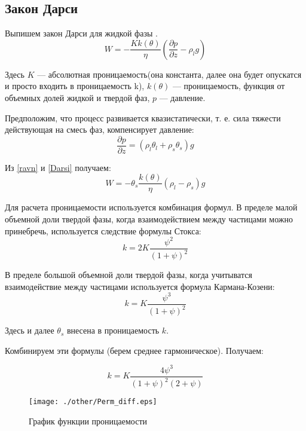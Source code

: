 \documentclass[12pt,a4paper]{article}
\newcommand{\pd}[2]{\frac{\partial #1}{\partial #2}}
\begin{document}
\subsection{Закон Дарси}
Выпишем закон Дарси для жидкой фазы \cite{Kond_mech_2007}.
\begin{equation}
W= -\frac{K k(\theta)}{\eta}\left(\pd{p}{z} - \rho_l g \right)
\label{Darsi}
\end{equation}

Здесь $ K $ --- абсолютная проницаемость(она константа, далее она будет опускатся и просто входить в проницаемость k), $k(\theta)$ --- проницаемость, функция от объемных долей жидкой и твердой фаз, $p$ --- давление. 

Предположим, что процесс развивается квазистатически, т. е. сила тяжести действующая на смесь фаз, компенсирует давление:
\begin{equation}
\pd{p}{z} = (\rho_l \theta_l + \rho_s \theta_s)g
\label{ravn}
\end{equation}

Из \eqref{ravn} и \eqref{Darsi} получаем:
\begin{equation}
W= -\theta_s \frac{k(\theta)}{\eta}(\rho_l-\rho_s)g
\label{Darsi_new}
\end{equation}

Для расчета проницаемости используется комбинация формул. В пределе малой объемной доли твердой фазы, когда взаимодействием между частицами можно принебречь, используется следствие формулы Стокса:
$$
k = 2 K\frac{\psi^2}{(1+\psi)^2} 
$$

В пределе большой объемной доли твердой фазы, когда учитыватся взаимодействие между частицами используется формула Кармана-Козени:
$$
k = K\frac{\psi^3}{(1+\psi)^2}
$$

Здесь и далее $\theta_s $ внесена в проницаемость $k$. %

Комбинируем эти формулы (берем среднее гармоническое). Получаем:

\begin{equation}
k = K \frac{4\psi^3}{(1+\psi)^2(2+\psi)}
\label{permability}
\end{equation}

\begin{figure}[h!]
\begin{center}
\texttt{[image: ./other/Perm\_diff.eps]}
\caption{График функции проницаемости}
\end{center}
\end{figure}
\newpage
\end{document}
